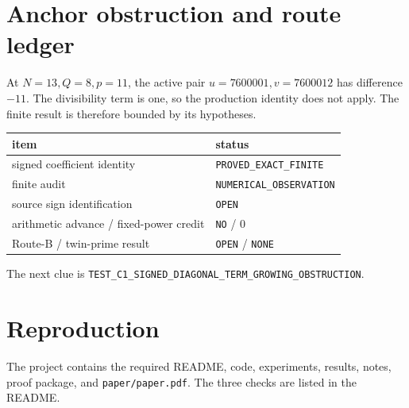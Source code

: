 \documentclass[11pt]{article}
\begin{document}
\section{Anchor obstruction and route ledger}
At $N=13,Q=8,p=11$, the active pair $u=7600001,v=7600012$ has difference $-11$.
The divisibility term is one, so the production identity does not apply.  The
finite result is therefore bounded by its hypotheses.
\begin{center}\begin{tabular}{@{}ll@{}}\toprule
item & status\\\midrule
signed coefficient identity & \texttt{PROVED\_EXACT\_FINITE}\\
finite audit & \texttt{NUMERICAL\_OBSERVATION}\\
source sign identification & \texttt{OPEN}\\
arithmetic advance / fixed-power credit & \texttt{NO} / 0\\
Route-B / twin-prime result & \texttt{OPEN} / \texttt{NONE}\\
\bottomrule\end{tabular}\end{center}
The next clue is \texttt{TEST\_C1\_SIGNED\_DIAGONAL\_TERM\_GROWING\_OBSTRUCTION}.
\section*{Reproduction}
The project contains the required README, code, experiments, results, notes,
proof package, and \texttt{paper/paper.pdf}.  The three checks are listed in
the README.
\end{document}
